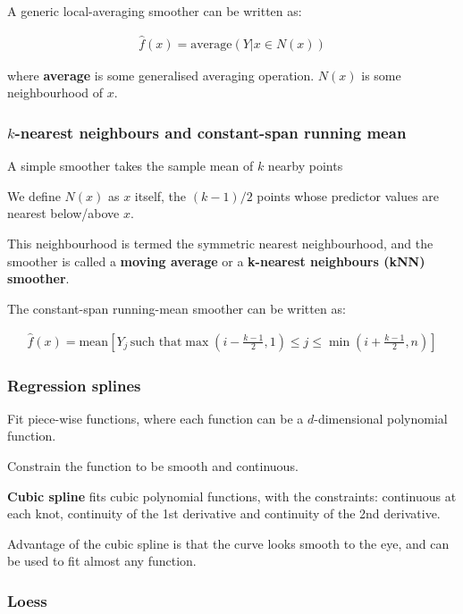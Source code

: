 A generic local-averaging smoother can be written as:

\begin{align*}
    \hat{f}(x)=\text{average}(Y|x\in N(x))
\end{align*}

where \textbf{average} is some generalised averaging operation. $N(x)$ is some neighbourhood of $x$.

\subsubsection{$k$-nearest neighbours and constant-span running mean}

\indent

A simple smoother takes the sample mean of $k$ nearby points

We define $N(x)$ as $x$ itself, the $(k-1)/2$ points whose predictor values are nearest below/above $x$.

This neighbourhood is termed the symmetric nearest neighbourhood, and the smoother is called a \textbf{moving average} or a \textbf{k-nearest neighbours (kNN) smoother}.

The constant-span running-mean smoother can be written as:

\begin{align*}
    \hat{f}(x) = \text{mean}[Y_j\,\text{such that} \max(i-\frac{k-1}{2},1)\leq j \leq \min(i+\frac{k-1}{2},n)]
\end{align*}

\subsubsection{Regression splines}

\indent 

Fit piece-wise functions, where each function can be a $d$-dimensional polynomial function.

Constrain the function to be smooth and continuous.

\textbf{Cubic spline} fits cubic polynomial functions, with the constraints: continuous at each knot, continuity of the 1st derivative and continuity of the 2nd derivative.

Advantage of the cubic spline is that the curve looks smooth to the eye, and can be used to fit almost any function.

\subsubsection{Loess}

